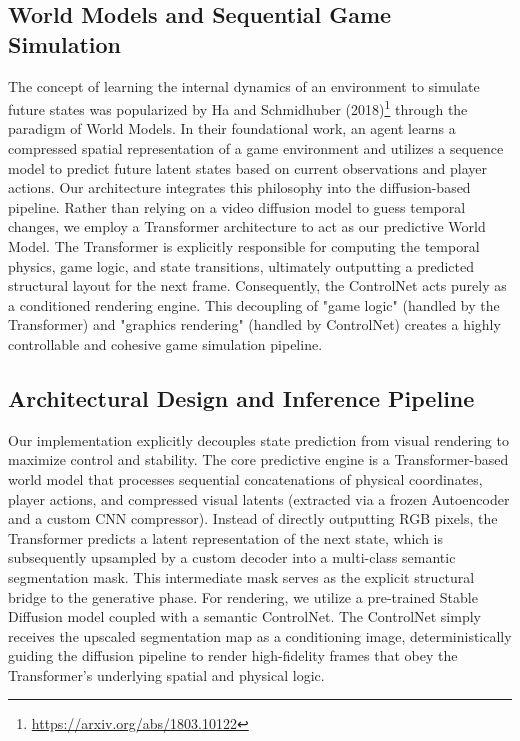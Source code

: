 \documentclass[twocolumn,a4paper]{article}
\begin{document}
\subsection{World Models and Sequential Game Simulation}

The concept of learning the internal dynamics of an environment to simulate future states was popularized by Ha and Schmidhuber (2018)\footnote{\url{https://arxiv.org/abs/1803.10122}} through the paradigm of World Models. In their foundational work, an agent learns a compressed spatial representation of a game environment and utilizes a sequence model to predict future latent states based on current observations and player actions. Our architecture integrates this philosophy into the diffusion-based pipeline. Rather than relying on a video diffusion model to guess temporal changes, we employ a Transformer architecture to act as our predictive World Model. The Transformer is explicitly responsible for computing the temporal physics, game logic, and state transitions, ultimately outputting a predicted structural layout for the next frame. Consequently, the ControlNet acts purely as a conditioned rendering engine. This decoupling of "game logic" (handled by the Transformer) and "graphics rendering" (handled by ControlNet) creates a highly controllable and cohesive game simulation pipeline.

\subsection{Architectural Design and Inference Pipeline}

Our implementation explicitly decouples state prediction from visual rendering to maximize control and stability. The core predictive engine is a Transformer-based world model that processes sequential concatenations of physical coordinates, player actions, and compressed visual latents (extracted via a frozen Autoencoder and a custom CNN compressor). Instead of directly outputting RGB pixels, the Transformer predicts a latent representation of the next state, which is subsequently upsampled by a custom decoder into a multi-class semantic segmentation mask. This intermediate mask serves as the explicit structural bridge to the generative phase. For rendering, we utilize a pre-trained Stable Diffusion model coupled with a semantic ControlNet. The ControlNet simply receives the upscaled segmentation map as a conditioning image, deterministically guiding the diffusion pipeline to render high-fidelity frames that obey the Transformer's underlying spatial and physical logic.
\end{document}
